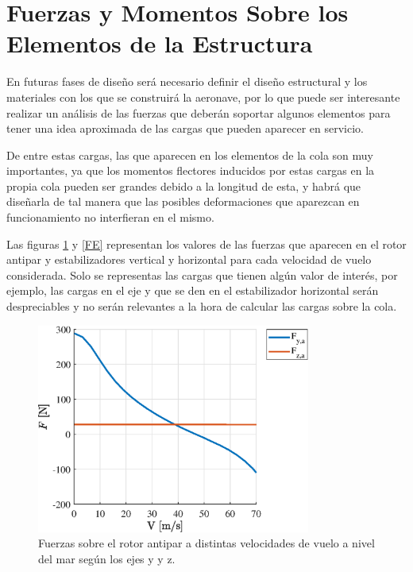 \section{Fuerzas y Momentos Sobre los Elementos de la Estructura}

En futuras fases de diseño será necesario definir el diseño estructural y los materiales con los que se construirá la aeronave, por lo que puede ser interesante realizar un análisis de las fuerzas que deberán soportar algunos elementos para tener una idea aproximada de las cargas que pueden aparecer en servicio.

De entre estas cargas, las que aparecen en los elementos de la cola son muy importantes, ya que los momentos flectores inducidos por estas cargas en la propia cola pueden ser grandes debido a la longitud de esta, y habrá que diseñarla de tal manera que las posibles deformaciones que aparezcan en funcionamiento no interfieran en el mismo.

Las figuras \ref{FAP} y \ref{FE} representan los valores de las fuerzas que aparecen en el rotor antipar y estabilizadores vertical y horizontal para cada velocidad de vuelo considerada. Solo se representas las cargas que tienen algún valor de interés, por ejemplo, las cargas en el eje y que se den en el estabilizador horizontal serán despreciables y no serán relevantes a la hora de calcular las cargas sobre la cola.

\begin{figure}
	\centering
	\includegraphics[width=90mm]{graficos/FAP}
	\caption{Fuerzas sobre el rotor antipar a distintas velocidades de vuelo a nivel del mar según los ejes y y z.}
	\label{FAP}
\end{figure}

